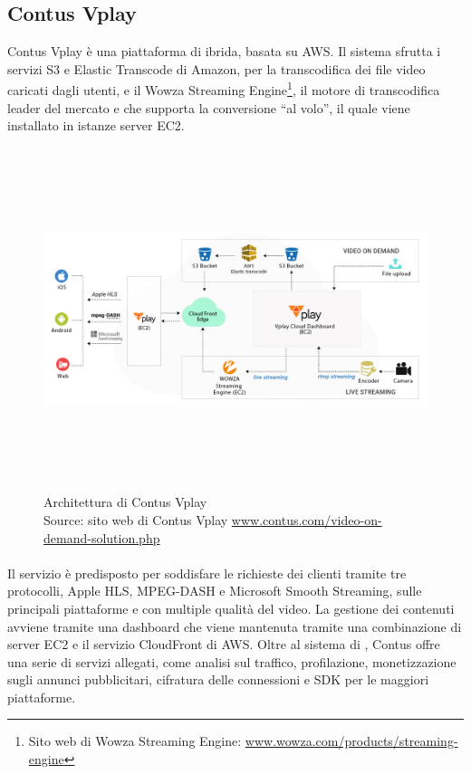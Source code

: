 		\subsection{Contus Vplay}
		Contus Vplay è una piattaforma di  ibrida, basata su \gls{AWS}. Il sistema sfrutta i servizi \gls{S3} e Elastic Transcode di Amazon, per la transcodifica dei file video caricati dagli utenti, e il Wowza Streaming Engine\footnote{Sito web di Wowza Streaming Engine: \href{https://www.wowza.com/products/streaming-engine}{www.wowza.com/products/streaming-engine}}, il motore di transcodifica leader del mercato e che supporta la conversione ``al volo'', il quale viene installato in istanze server \gls{EC2}.
		\begin{figure}[H]
			\begin{center}
				\includegraphics[width=16.5cm,height=10cm,keepaspectratio]{immagini/contus-vplay-cloud-architecture.jpg}
				\caption[Architettura di Contus Vplay]{Architettura di Contus Vplay
				\\
				Source: sito web di Contus Vplay \href{http://www.contus.com/video-on-demand-solution.php}{www.contus.com/video-on-demand-solution.php}}
			\end{center}
		\end{figure}
		\paragraph*{} Il servizio è predisposto per soddisfare le richieste dei clienti tramite tre protocolli, Apple \gls{HLS}, \gls{MPEG-DASH} e Microsoft Smooth Streaming, sulle principali piattaforme e con multiple qualità del video. La gestione dei contenuti avviene tramite una dashboard che viene mantenuta tramite una combinazione di server \gls{EC2} e il servizio CloudFront di \gls{AWS}. Oltre al sistema di , Contus offre una serie di servizi allegati, come analisi sul traffico, profilazione, monetizzazione sugli annunci pubblicitari, cifratura delle connessioni e \gls{SDK} per le maggiori piattaforme.
	
